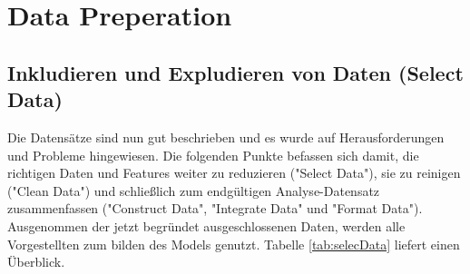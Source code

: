\section{Data Preperation}
\subsection*{Inkludieren und Expludieren von Daten (Select Data)}
Die Datensätze sind nun gut beschrieben und es wurde auf Herausforderungen und Probleme hingewiesen. Die folgenden Punkte befassen sich damit, die richtigen Daten und Features weiter zu reduzieren ("Select Data"), sie zu reinigen ("Clean Data") und schließlich zum endgültigen Analyse-Datensatz zusammenfassen ("Construct Data", "Integrate Data" und "Format Data").
Ausgenommen der jetzt begründet ausgeschlossenen Daten, werden alle Vorgestellten zum bilden des Models genutzt. Tabelle \ref{tab:selecData} liefert einen Überblick.

